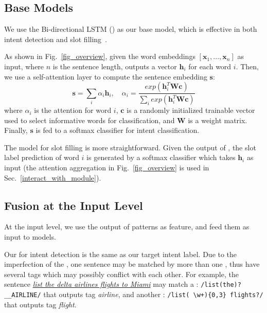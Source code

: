 \subsection{Base Models}
We use the Bi-directional LSTM (\BLSTM) as our base \NN model, which is effective in both intent detection and slot
filling~\cite{liu2016attention}.

As shown in Fig.~\ref{fig_overview}, given the word embeddings $[\textbf{x}_1, ..., \textbf{x}_n]$ as input, where $n$ is the sentence length, \BLSTM outputs a vector $\textbf{h}_i$ for each word $i$.
Then, we use a self-attention layer to compute the sentence embedding $\textbf{s}$:
\begin{equation}
\textbf{s} = \sum_{i}{\alpha_i\textbf{h}_i}, \quad \alpha_i=\frac{exp(\textbf{h}_i^T\textbf{Wc})}{\sum_{i}{exp(\textbf{h}_i^T\textbf{Wc})}}
\label{eq:simple_att}
\end{equation}
where  $\alpha_i$ is the attention for word $i$, $\textbf{c}$ is a randomly initialized trainable vector used to select informative words for classification, and $\textbf{W}$ is a weight matrix.
Finally, $\textbf{s}$ is fed to a softmax classifier for intent classification.

The model for slot filling is more straightforward. Given the output of \BLSTM, the slot label prediction of word $i$ is generated by a
softmax classifier which takes $\textbf{h}_i$ as input (the attention aggregation in Fig.~\ref{fig_overview} is used in Sec.~\ref{interact_with_module}).


\subsection{Fusion at the Input Level}
\label{fusion_with_input}
At the input level, we use the output of \RE patterns as feature, and feed them as input to \NN models.

Our \REtag for intent detection is the same as our target intent label.
Due to the imperfection of the \REs, one sentence may be matched by more than one \REs, thus have several \RE tags which may possibly conflict with each other. For example, the
sentence \textsl{\underline{list the delta airlines flights to Miami}} may match a \RE: {\small \texttt{/list(\;the)?\;\_\_AIRLINE/}} that outputs
tag \emph{airline}, and another \RE: {\small \texttt{/list(\,\textbackslash w+)\{0,3\} flights?/}} that outputs tag \emph{flight}.

